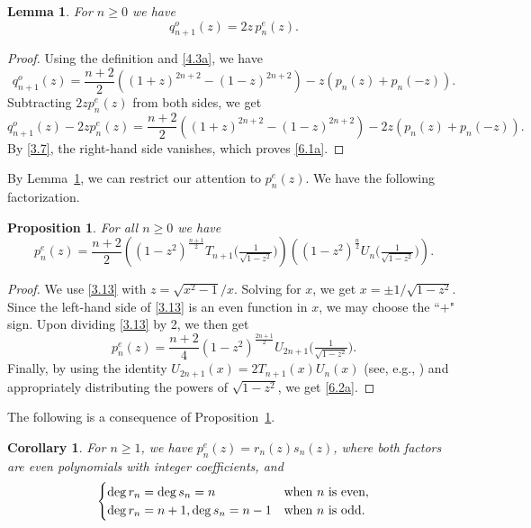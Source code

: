 \documentclass{amsart}
\theoremstyle{plain}
\newtheorem{corollary}[theorem]{Corollary}
\newtheorem{proposition}[theorem]{Proposition}
\newtheorem{lemma}[theorem]{Lemma}
\numberwithin{equation}{section}
\begin{document}
\begin{lemma}\label{lem:6.1a}
For $n\geq 0$ we have
\begin{equation}\label{6.1a}
q_{n+1}^o(z)=2z\,p_n^e(z).
\end{equation}
\end{lemma}

\begin{proof}
Using the definition and \eqref{4.3a}, we have
\[
q_{n+1}^o(z)=\frac{n+2}{2}\left((1+z)^{2n+2}-(1-z)^{2n+2}\right)
-z\left(p_n(z)+p_n(-z)\right).
\]
Subtracting $2zp_n^e(z)$ from both sides, we get
\[
q_{n+1}^o(z)-2zp_n^e(z)=\frac{n+2}{2}\left((1+z)^{2n+2}-(1-z)^{2n+2}\right)
-2z\left(p_n(z)+p_n(-z)\right).
\]
By \eqref{3.7}, the right-hand side vanishes, which proves \eqref{6.1a}.
\end{proof}

By Lemma~\ref{lem:6.1a}, we can restrict our attention to $p_n^e(z)$. We have
the following factorization.

\begin{proposition}\label{prop:6.2a}
For all $n\geq 0$ we have
\begin{equation}\label{6.2a}
p_n^e(z)=\frac{n+2}{2}
\left((1-z^2)^{\frac{n+1}{2}}T_{n+1}\big(\tfrac{1}{\sqrt{1-z^2}}\big)\right)
\left((1-z^2)^{\frac{n}{2}}U_{n}\big(\tfrac{1}{\sqrt{1-z^2}}\big)\right).
\end{equation}
\end{proposition}

\begin{proof}
We use \eqref{3.13} with $z=\sqrt{x^2-1}/x$. Solving for $x$, we get
$x=\pm 1/\sqrt{1-z^2}$. Since the left-hand side of \eqref{3.13} is an even
function in $x$, we may choose the ``$+$" sign. Upon dividing \eqref{3.13} by
2, we then get
\[
p_n^e(z)=\frac{n+2}{4}
(1-z^2)^{\frac{2n+1}{2}}U_{2n+1}\big(\tfrac{1}{\sqrt{1-z^2}}\big).
\]
Finally, by using the identity $U_{2n+1}(x)=2T_{n+1}(x)U_{n}(x)$ (see, e.g., 
\cite[p.~229]{Ri}) and appropriately distributing the powers of $\sqrt{1-z^2}$,
we get \eqref{6.2a}.
\end{proof}

The following is a consequence of Proposition~\ref{prop:6.2a}.

\begin{corollary}\label{cor:6.3a}
For $n\geq 1$, we have $p_n^e(z)=r_n(z)s_n(z)$, where both factors are even
polynomials with integer coefficients, and
\[
\begin{cases}
\deg{r_n}=\deg{s_n}=n & \hbox{when $n$ is even},\\
\deg{r_n}=n+1, \deg{s_n}=n-1 & \hbox{when $n$ is odd}.
\end{cases}
\]
\end{corollary}
\end{document}
